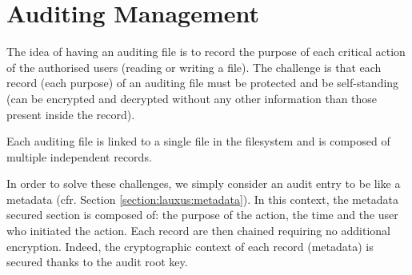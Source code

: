 \documentclass[../main.tex]{subfiles}
\begin{document}
\section{Auditing Management}
\par The idea of having an auditing file is to record the purpose of each critical action of the authorised users (reading or writing a file). The challenge is that each record (each purpose) of an auditing file must be protected and be self-standing (can be encrypted and decrypted without any other information than those present inside the record).
\par Each auditing file is linked to a single file in the filesystem and is composed of multiple independent records.
\par In order to solve these challenges, we simply consider an audit entry to be like a metadata (cfr. Section \ref{section:lauxus:metadata}). In this context, the metadata secured section is composed of: the purpose of the action, the time and the user who initiated the action. Each record are then chained requiring no additional encryption. Indeed, the cryptographic context of each record (metadata) is secured thanks to the audit root key.
\end{document}
